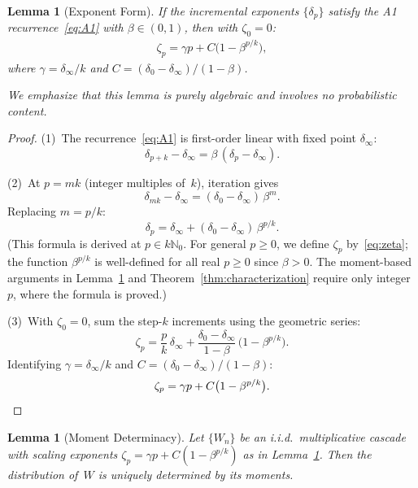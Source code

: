 \documentclass[12pt]{amsart}
\newtheorem{lemma}[theorem]{Lemma}
\theoremstyle{definition}
\theoremstyle{remark}
\begin{document}
\begin{lemma}[Exponent Form]\label{lem:exponent}
If the incremental exponents $\{\delta_p\}$ satisfy the A1
recurrence~\eqref{eq:A1} with $\beta \in (0,1)$, then with $\zeta_0
= 0$:
\begin{align}\label{eq:zeta}
  \zeta_p = \gamma p + C\bigl(1 - \beta^{p/k}\bigr),
  \tag{$**$}
\end{align}
where $\gamma = \delta_\infty / k$ and $C = (\delta_0 -
\delta_\infty)/(1 - \beta)$.

We emphasize that this lemma is purely algebraic and involves no
probabilistic content.
\end{lemma}

\begin{proof}
(1)~The recurrence~\eqref{eq:A1} is first-order linear with fixed
point $\delta_\infty$:
\[
  \delta_{p+k} - \delta_\infty = \beta\,(\delta_p - \delta_\infty).
\]

(2)~At $p = mk$ (integer multiples of~$k$), iteration gives
\[
  \delta_{mk} - \delta_\infty
  = (\delta_0 - \delta_\infty)\,\beta^m.
\]
Replacing $m = p/k$:
\[
  \delta_p
  = \delta_\infty + (\delta_0 - \delta_\infty)\,\beta^{p/k}.
\]
(This formula is derived at $p \in k\mathbb{N}_0$.  For general $p
\geq 0$, we define $\zeta_p$ by~\eqref{eq:zeta}; the function
$\beta^{p/k}$ is well-defined for all real $p \geq 0$ since $\beta >
0$.  The moment-based arguments in Lemma~\ref{lem:determinacy} and
Theorem~\ref{thm:characterization} require only integer~$p$, where
the formula is proved.)

(3)~With $\zeta_0 = 0$, sum the step-$k$ increments using the
geometric series:
\[
  \zeta_p
  = \frac{p}{k}\,\delta_\infty
    + \frac{\delta_0 - \delta_\infty}{1 - \beta}\,
      \bigl(1 - \beta^{p/k}\bigr).
\]
Identifying $\gamma = \delta_\infty/k$ and $C = (\delta_0 -
\delta_\infty)/(1-\beta)$:
\[
  \zeta_p = \gamma p + C\bigl(1 - \beta^{p/k}\bigr).  \qedhere
\]
\end{proof}


\begin{lemma}[Moment Determinacy]\label{lem:determinacy}
Let $\{W_n\}$ be an i.i.d.\ multiplicative cascade with scaling
exponents $\zeta_p = \gamma p + C(1 - \beta^{p/k})$ as in
Lemma~\ref{lem:exponent}.  Then the distribution of~$W$ is uniquely
determined by its moments.
\end{lemma}
\end{document}
